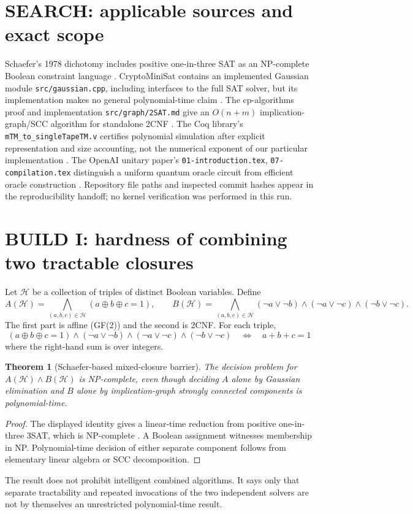 \documentclass[11pt]{article}
\newtheorem{theorem}{Theorem}
\begin{document}
\section{SEARCH: applicable sources and exact scope}
Schaefer's 1978 dichotomy includes positive one-in-three SAT as an NP-complete Boolean constraint language \cite{schaefer1978}. CryptoMiniSat contains an implemented Gaussian module \texttt{src/gaussian.cpp}, including interfaces to the full SAT solver, but its implementation makes no general polynomial-time claim \cite{cms}. The cp-algorithms proof and implementation \texttt{src/graph/2SAT.md} give an $O(n+m)$ implication-graph/SCC algorithm for standalone 2CNF \cite{cpalg}. The Coq library's \texttt{mTM\_to\_singleTapeTM.v} certifies polynomial simulation after explicit representation and size accounting, not the numerical exponent of our particular implementation \cite{coqlib}. The OpenAI unitary paper's \texttt{01-introduction.tex}, \texttt{07-compilation.tex} distinguish a uniform quantum oracle circuit from efficient oracle construction \cite{openai2026}. Repository file paths and inspected commit hashes appear in the reproducibility handoff; no kernel verification was performed in this run.

\section{BUILD I: hardness of combining two tractable closures}
Let $\mathcal H$ be a collection of triples of distinct Boolean variables. Define
\[
 A(\mathcal H)=\bigwedge_{(a,b,c)\in\mathcal H}(a\oplus b\oplus c=1),
\qquad
 B(\mathcal H)=\bigwedge_{(a,b,c)\in\mathcal H}
 (\neg a\vee\neg b)\wedge(\neg a\vee\neg c)\wedge(\neg b\vee\neg c).
\]
The first part is affine (GF(2)) and the second is 2CNF. For each triple,
\[
 (a\oplus b\oplus c=1)\wedge(\neg a\vee\neg b)\wedge
 (\neg a\vee\neg c)\wedge(\neg b\vee\neg c)
\quad\Longleftrightarrow\quad a+b+c=1
\]
where the right-hand sum is over integers.
\begin{theorem}[Schaefer-based mixed-closure barrier]
The decision problem for $A(\mathcal H)\wedge B(\mathcal H)$ is NP-complete, even though deciding $A$ alone by Gaussian elimination and $B$ alone by implication-graph strongly connected components is polynomial-time.
\end{theorem}
\begin{proof}
The displayed identity gives a linear-time reduction from positive one-in-three 3SAT, which is NP-complete \cite{schaefer1978}. A Boolean assignment witnesses membership in NP. Polynomial-time decision of either separate component follows from elementary linear algebra or SCC decomposition.
\end{proof}
The result does not prohibit intelligent combined algorithms. It says only that separate tractability and repeated invocations of the two independent solvers are not by themselves an unrestricted polynomial-time result.
\end{document}
